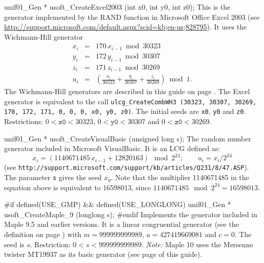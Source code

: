 {unif01_Gen * usoft_CreateExcel2003 (int x0, int y0, int z0);
\endcode
  \tab  
  This is the generator implemented by the {RAND} function in
 \label{gen:Excel2003}%
%
  Microsoft Office Excel 2003
 (see \url{http://support.microsoft.com/default.aspx?scid=kb;en-us;828795}).
  It uses the Wichmann-Hill generator \cite{rWIC82a,rWIC87a}
\begin{eqnarray*}
      x_{i} &=& 170 \, x_{i-1} \bmod 30323 \\
      y_{i} &=& 172 \, y_{i-1} \bmod 30307 \\
      z_{i} &=& 171 \, z_{i-1} \bmod 30269 \\[6pt]
      u_i   &=& \left(\frac{x_i}{30323} + \frac{y_i}{30307} + 
                    \frac{z_i}{30269}\right) \bmod 1.
\end{eqnarray*}
  The Wichmann-Hill generators are described in this guide on page
  \pageref{gen:Wichmann-Hill}.  The Excel generator is equivalent to the call
 \texttt{ulcg\_CreateCombWH3 (30323, 30307, 30269, 170, 172, 171,
   0, 0, 0, x0, y0, z0)}.  The initial seeds are \texttt{x0},
   \texttt{y0} and  \texttt{z0}.
 Restrictions: $0 < \texttt{x0} < 30323$,
 $0 < \texttt{y0} < 30307$ and $0 < \texttt{z0} < 30269$.
 \endtab
\code


unif01_Gen * usoft_CreateVisualBasic (unsigned long s);
\endcode
  \tab  
  The random number generator included in Microsoft VisualBasic. 
%
  It is an LCG defined as: 
$$
    x_{i}  = (1140671485\,  x_{i-1} + 12820163) \mod 2^{24}; \qquad
    u_i = x_i / 2^{24}
$$
(see {\tt {http://support.microsoft.com/support/kb/articles/Q231/8/47.ASP}}).
  The parameter {\tt s} gives the seed $x_0$. Note that the multiplier
  1140671485 in the equation above is equivalent to 16598013, since 
  $1140671485 \mod 2^{24} = 16598013$.
  \endtab
\code


#if defined(USE_GMP) && defined(USE_LONGLONG)
   unif01_Gen * usoft_CreateMaple_9 (longlong s);
#endif
\endcode
  \tab Implements the generator included in {\sc Maple 9.5} and earlier versions.
  It is a linear congruential generator (see the definition on page \pageref{lcg})
  with $m=999999999989$, $a=427419669081$ and $c = 0$. The seed is $s$.
  Restriction: $0 < s < 999999999989$. {\em Note:} {\sc Maple 10} uses the 
  Mersenne  twister MT19937 as its basic generator
  (see page \pageref{rng:MT19937} of this guide).  
  \endtab
\code


}

